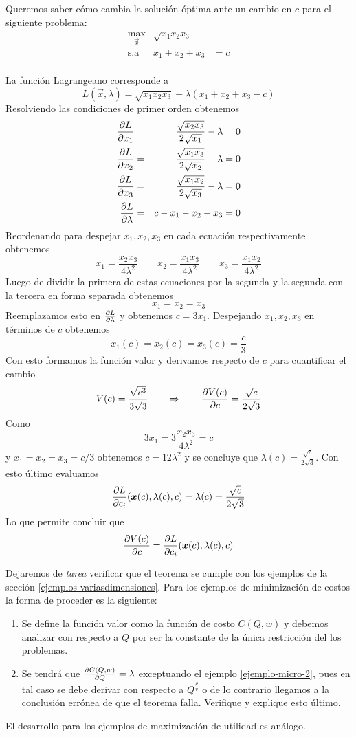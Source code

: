 \begin{ejemplo} Queremos saber c\'omo cambia la soluci\'on \'optima ante un cambio en $c$ para el siguiente problema:
$$\begin{array}{ccc}
\displaystyle \max_{\vec{x}}        & \sqrt{x_1 x_2 x_3}  &   \\
\text{s.a}  & x_1+x_2+x_3     &=c \\ 
\end{array}$$

La funci\'on Lagrangeano corresponde a
$$L(\vec{x},\lambda)=\sqrt{x_1 x_2 x_3} - \lambda(x_1+x_2+x_3 - c)$$
Resolviendo las condiciones de primer orden obtenemos
\begin{eqnarray*}
\frac{\partial L}{\partial x_1}&=&\frac{\sqrt{x_2x_3}}{2\sqrt{x_1}}-\lambda=0 \\
\frac{\partial L}{\partial x_2}&=&\frac{\sqrt{x_1x_3}}{2\sqrt{x_2}}-\lambda=0 \\
\frac{\partial L}{\partial x_3}&=&\frac{\sqrt{x_1x_2}}{2\sqrt{x_3}}-\lambda=0 \\
\frac{\partial L}{\partial \lambda}&=&c-x_1-x_2-x_3=0
\end{eqnarray*}
Reordenando para despejar $x_1,x_2,x_3$ en cada ecuaci\'on respectivamente obtenemos
$$
x_1=\frac{x_2x_3}{4\lambda^2} \qquad 
x_2=\frac{x_1x_3}{4\lambda^2} \qquad
x_3=\frac{x_1x_2}{4\lambda^2}
$$
Luego de dividir la primera de estas ecuaciones por la segunda y la segunda con la tercera en forma separada obtenemos
$$x_1=x_2=x_3$$
Reemplazamos esto en $\frac{\partial L}{\partial \lambda}$ y obtenemos $c=3x_1$. Despejando $x_1,x_2,x_3$ en t\'erminos de $c$ obtenemos
$$x_1(c)=x_2(c)=x_3(c)=\frac{c}{3} $$
Con esto formamos la funci\'on valor y derivamos respecto de $c$ para cuantificar el cambio
$$V(c)=\frac{\sqrt{c^3}}{3\sqrt{3}} \qquad \Rightarrow \qquad \frac{\partial V(c)}{\partial c}=\frac{\sqrt{c}}{2\sqrt{3}}$$
Como 
$$3x_1=3\frac{x_2x_3}{4\lambda^2}=c$$ 
y $x_1=x_2=x_3=c/3$ obtenemos $c=12\lambda^2$ y se concluye que $\lambda (c)=\frac{\sqrt{c}}{2\sqrt{3}}$. Con esto \'ultimo evaluamos 
$$\frac{\partial L}{\partial c_i}(\boldsymbol{x}(c),\lambda(c),c)=\lambda (c) = \frac{\sqrt{c}}{2\sqrt{3}}$$
Lo que permite concluir que
$$\frac{\partial V(c)}{\partial c} = \frac{\partial L}{\partial c_i}(\boldsymbol{x}(c),\lambda(c),c)$$ 
\end{ejemplo}

Dejaremos de \emph{tarea} verificar que el teorema se cumple con los ejemplos de la secci\'on \ref{ejemplos-variasdimensiones}. Para los ejemplos de minimizaci\'on de costos la forma de proceder es la siguiente:
\begin{enumerate}
\item Se define la funci\'on valor como la funci\'on de costo $C(Q,w)$ y debemos analizar con respecto a $Q$ por ser la constante de la \'unica restricci\'on del los problemas.
\item Se tendr\'a que $\frac{\partial C(Q,w)}{\partial Q}=\lambda$ exceptuando el ejemplo \ref{ejemplo-micro-2}, pues en tal caso se debe derivar con respecto a $Q^{\frac{\rho}{v}}$ o de lo contrario llegamos a la conclusi\'on err\'onea de que el teorema falla. Verifique y explique esto \'ultimo.
\end{enumerate}
El desarrollo para los ejemplos de maximizaci\'on de utilidad es an\'alogo.


